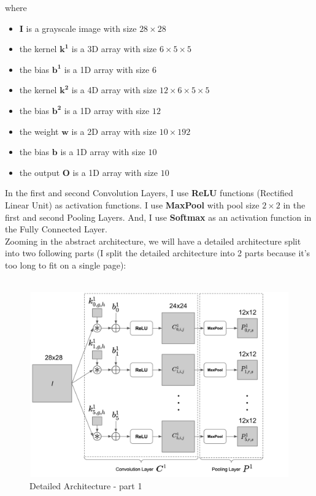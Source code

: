 \documentclass[a4paper,12pt]{article}
\begin{document}
where 
\begin{itemize}
\item $\boldsymbol{I}$ is a grayscale image with size $28\times28$
\item the kernel $\boldsymbol{k^1}$ is a 3D array with size $6\times5\times5$
\item the bias $\boldsymbol{b^1}$ is a 1D array with size $6$
\item the kernel $\boldsymbol{k^2}$ is a 4D array with size $12\times6\times5\times5$
\item the bias $\boldsymbol{b^2}$ is a 1D array with size $12$
\item the weight $\boldsymbol{w}$ is a 2D array with size $10\times192$
\item the bias $\boldsymbol{b}$ is a 1D array with size $10$
\item the output $\boldsymbol{O}$ is a 1D array with size $10$
\end{itemize}
In the first and second Convolution Layers, I use \textbf{ReLU} functions (Rectified Linear Unit) as activation functions. I use \textbf{MaxPool} with pool size $2\times2$ in the first and second Pooling Layers. And, I use \textbf{Softmax} as an activation function in the Fully Connected Layer.\\
Zooming in the abstract architecture, we will have a detailed architecture split into two following parts (I split the detailed architecture into 2 parts because it's too long to fit on a single page):\\
\\
\begin{figure}[h]
  \begin{center}
    \includegraphics[width=11.6cm, height=8cm]{Architecture-part1.png}
    \caption{Detailed Architecture - part 1}
  \end{center}
\end{figure}
\end{document}
